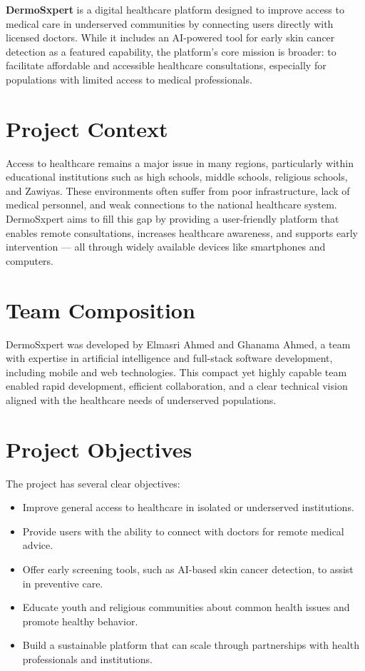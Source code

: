 \textbf{DermoSxpert} is a digital healthcare platform designed to improve access to medical care in underserved communities by connecting users directly with licensed doctors. While it includes an AI-powered tool for early skin cancer detection as a featured capability, the platform’s core mission is broader: to facilitate affordable and accessible healthcare consultations, especially for populations with limited access to medical professionals.

\section{Project Context}

Access to healthcare remains a major issue in many regions, particularly within educational institutions such as high schools, middle schools, religious schools, and Zawiyas. These environments often suffer from poor infrastructure, lack of medical personnel, and weak connections to the national healthcare system. DermoSxpert aims to fill this gap by providing a user-friendly platform that enables remote consultations, increases healthcare awareness, and supports early intervention — all through widely available devices like smartphones and computers.

\section{Team Composition}

DermoSxpert was developed by Elmasri Ahmed and Ghanama Ahmed, a team with expertise in artificial intelligence and full-stack software development, including mobile and web technologies. This compact yet highly capable team enabled rapid development, efficient collaboration, and a clear technical vision aligned with the healthcare needs of underserved populations.

\section{Project Objectives}

The project has several clear objectives:

\begin{itemize}
    \item Improve general access to healthcare in isolated or underserved institutions.
    \item Provide users with the ability to connect with doctors for remote medical advice.
    \item Offer early screening tools, such as AI-based skin cancer detection, to assist in preventive care.
    \item Educate youth and religious communities about common health issues and promote healthy behavior.
    \item Build a sustainable platform that can scale through partnerships with health professionals and institutions.
\end{itemize}

